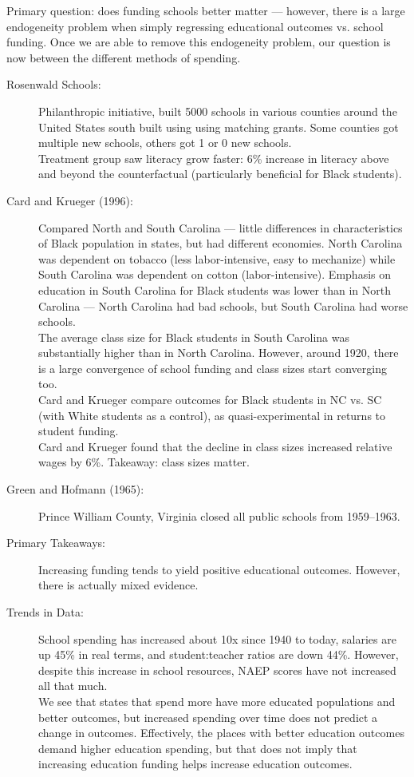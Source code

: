 \documentclass[10pt]{extarticle}
\begin{document}
  Primary question: does funding schools better matter --- however, there is a large endogeneity problem when simply regressing educational outcomes vs. school funding. Once we are able to remove this endogeneity problem, our question is now between the different methods of spending.
  \begin{description}
    \item[Rosenwald Schools:] Philanthropic initiative, built 5000 schools in various counties around the United States south built using using matching grants. Some counties got multiple new schools, others got 1 or 0 new schools.\\

      Treatment group saw literacy grow faster: 6\% increase in literacy above and beyond the counterfactual (particularly beneficial for Black students).
    \item[Card and Krueger (1996):] Compared North and South Carolina --- little differences in characteristics of Black population in states, but had different economies. North Carolina was dependent on tobacco (less labor-intensive, easy to mechanize) while South Carolina was dependent on cotton (labor-intensive). Emphasis on education in South Carolina for Black students was lower than in North Carolina --- North Carolina had bad schools, but South Carolina had worse schools.\\

      The average class size for Black students in South Carolina was substantially higher than in North Carolina. However, around 1920, there is a large convergence of school funding and class sizes start converging too.\\

      Card and Krueger compare outcomes for Black students in NC vs. SC (with White students as a control), as quasi-experimental in returns to student funding.\\
      
      Card and Krueger found that the decline in class sizes increased relative wages by 6\%. Takeaway: class sizes matter.
    \item[Green and Hofmann (1965):] Prince William County, Virginia closed all public schools from 1959--1963.
    \item[Primary Takeaways:] Increasing funding tends to yield positive educational outcomes. However, there is actually mixed evidence.
    \item[Trends in Data:] School spending has increased about 10x since 1940 to today, salaries are up 45\% in real terms, and student:teacher ratios are down 44\%. However, despite this increase in school resources, NAEP scores have not increased all that much.\\

      We see that states that spend more have more educated populations and better outcomes, but increased spending over time does not predict a change in outcomes. Effectively, the places with better education outcomes demand higher education spending, but that does not imply that increasing education funding helps increase education outcomes.
  \end{description}
\end{document}

